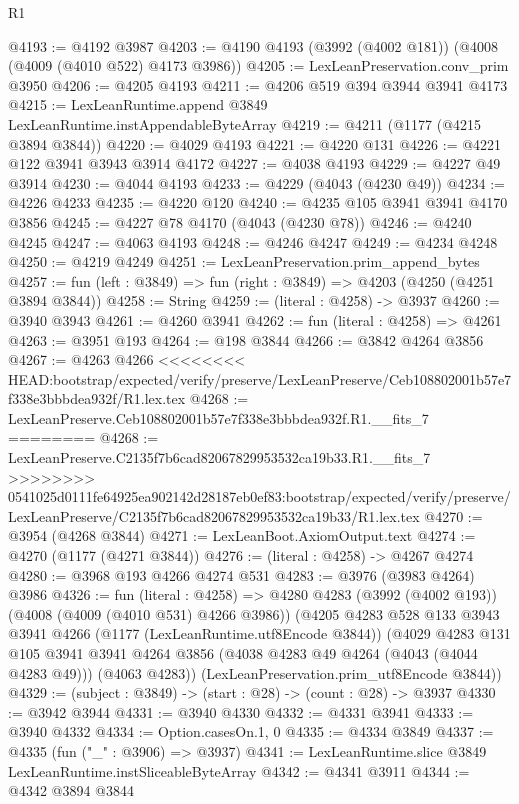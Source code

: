 \begin{lexlean}{R1}
\begin{coremodule}
{{{{{{{{{{{{{{{{{{{{{{{{{{{{{{{{{{{{{{{{{{{{{{{{{{{{{{{{{{{{{{{{{{{{{{{{{{{{{{{{{{{{{{{{{{{{{{{{{{{{{{{{{{{{{{{{{{{{{{{{{{{{{{{{{{{{{{{{{{{{{{{{{{{{{{{{{{{{{{{{{{{{{{{{{{{{{{{{{{{{{{{{{{@4193 := @4192 @3987
@4203 := @4190 @4193 (@3992 (@4002 @181)) (@4008 (@4009 (@4010 @522) @4173 @3986))
@4205 := LexLeanPreservation.conv_prim @3950
@4206 := @4205 @4193
@4211 := @4206 @519 @394 @3944 @3941 @4173
@4215 := LexLeanRuntime.append @3849 LexLeanRuntime.instAppendableByteArray
@4219 := @4211 (@1177 (@4215 @3894 @3844))
@4220 := @4029 @4193
@4221 := @4220 @131
@4226 := @4221 @122 @3941 @3943 @3914 @4172
@4227 := @4038 @4193
@4229 := @4227 @49 @3914
@4230 := @4044 @4193
@4233 := @4229 (@4043 (@4230 @49))
@4234 := @4226 @4233
@4235 := @4220 @120
@4240 := @4235 @105 @3941 @3941 @4170 @3856
@4245 := @4227 @78 @4170 (@4043 (@4230 @78))
@4246 := @4240 @4245
@4247 := @4063 @4193
@4248 := @4246 @4247
@4249 := @4234 @4248
@4250 := @4219 @4249
@4251 := LexLeanPreservation.prim_append_bytes
@4257 := fun (left : @3849) => fun (right : @3849) => @4203 (@4250 (@4251 @3894 @3844))
@4258 := String
@4259 := (literal : @4258) -> @3937
@4260 := @3940 @3943
@4261 := @4260 @3941
@4262 := fun (literal : @4258) => @4261
@4263 := @3951 @193
@4264 := @198 @3844
@4266 := @3842 @4264 @3856
@4267 := @4263 @4266
<<<<<<<< HEAD:bootstrap/expected/verify/preserve/LexLeanPreserve/Ceb108802001b57e7f338e3bbbdea932f/R1.lex.tex
@4268 := LexLeanPreserve.Ceb108802001b57e7f338e3bbbdea932f.R1.__fits_7
========
@4268 := LexLeanPreserve.C2135f7b6cad82067829953532ca19b33.R1.__fits_7
>>>>>>>> 0541025d0111fe64925ea902142d28187eb0ef83:bootstrap/expected/verify/preserve/LexLeanPreserve/C2135f7b6cad82067829953532ca19b33/R1.lex.tex
@4270 := @3954 (@4268 @3844)
@4271 := LexLeanBoot.AxiomOutput.text
@4274 := @4270 (@1177 (@4271 @3844))
@4276 := (literal : @4258) -> @4267 @4274
@4280 := @3968 @193 @4266 @4274 @531
@4283 := @3976 (@3983 @4264) @3986
@4326 := fun (literal : @4258) =>
  @4280
    @4283
    (@3992 (@4002 @193))
    (@4008 (@4009 (@4010 @531) @4266 @3986))
    (@4205
      @4283
      @528
      @133
      @3943
      @3941
      @4266
      (@1177 (LexLeanRuntime.utf8Encode @3844))
      (@4029
        @4283
        @131
        @105
        @3941
        @3941
        @4264
        @3856
        (@4038 @4283 @49 @4264 (@4043 (@4044 @4283 @49)))
        (@4063 @4283))
      (LexLeanPreservation.prim_utf8Encode @3844))
@4329 := (subject : @3849) -> (start : @28) -> (count : @28) -> @3937
@4330 := @3942 @3944
@4331 := @3940 @4330
@4332 := @4331 @3941
@4333 := @3940 @4332
@4334 := Option.casesOn.{1, 0}
@4335 := @4334 @3849
@4337 := @4335 (fun ("_" : @3906) => @3937)
@4341 := LexLeanRuntime.slice @3849 LexLeanRuntime.instSliceableByteArray
@4342 := @4341 @3911
@4344 := @4342 @3894 @3844
}}}}}}}}}}}}}}}}}}}}}}}}}}}}}}}}}}}}}}}}}}}}}}}}}}}}}}}}}}}}}}}}}}}}}}}}}}}}}}}}}}}}}}}}}}}}}}}}}}}}}}}}}}}}}}}}}}}}}}}}}}}}}}}}}}}}}}}}}}}}}}}}}}}}}}}}}}}}}}}}}}}}}}}}}}}}}}}}}}}}}}}}}}
\end{coremodule}
\end{lexlean}
